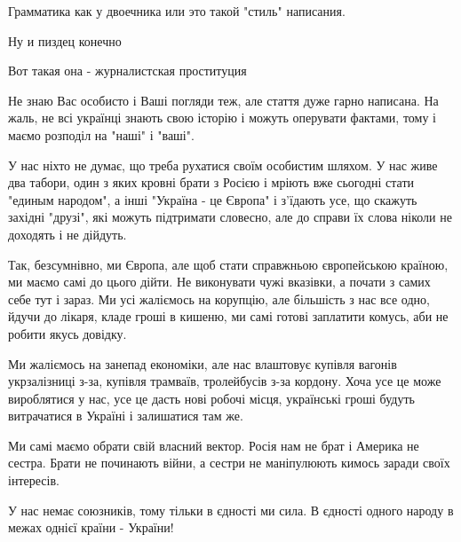 \begin{itemize}
Грамматика как у двоечника или это такой "стиль" написания.

 
Ну и пиздец конечно

 
Вот такая она - журналистская проституция

 

Не знаю Вас особисто і Ваші погляди теж, але стаття дуже гарно написана. На
жаль, не всі українці знають свою історію і можуть оперувати фактами, тому і
маємо розподіл на "наші" і "ваші". 

У нас ніхто не думає, що треба рухатися своїм особистим шляхом. У нас живе два
табори, один з яких кровні брати з Росією і мріють вже сьогодні стати "единым
народом", а інші "Україна - це Європа" і з'їдають усе, що скажуть західні
"друзі", які можуть підтримати словесно, але до справи їх слова ніколи не
доходять і не дійдуть. 

Так, безсумнівно, ми Європа, але щоб стати справжньою європейською країною, ми
маємо самі до цього дійти. Не виконувати чужі вказівки, а почати з самих себе
тут і зараз. Ми усі жаліємось на корупцію, але більшість з нас все одно, йдучи
до лікаря, кладе гроші в кишеню, ми самі готові заплатити комусь, аби не робити
якусь довідку.

Ми жаліємось на занепад економіки, але нас влаштовує купівля вагонів
укрзалізниці з-за, купівля трамваїв, тролейбусів з-за кордону. Хоча усе це може
вироблятися у нас, усе це дасть нові робочі місця, українські гроші будуть
витрачатися в Україні і залишатися там же. 

Ми самі маємо обрати свій власний вектор. Росія нам не брат і Америка не
сестра. Брати не починають війни, а сестри не маніпулюють кимось заради своїх
інтересів. 

У нас немає союзників, тому тільки в єдності ми сила. В єдності одного народу в
межах однієї країни - України!


\end{itemize}
